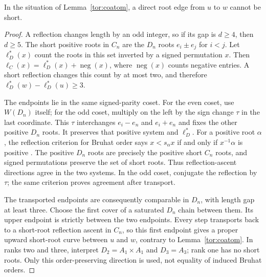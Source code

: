 \begin{lemma}\label{tor:short-edge}
In the situation of Lemma~\ref{tor:coatom}, a direct root edge from $u$ to $w$ cannot be short.
\end{lemma}
\begin{proof}
A reflection changes length by an odd integer, so if its gap is $d\ge4$, then $d\ge5$. The short positive roots in $C_n$ are the $D_n$ roots $e_i\pm e_j$ for $i<j$. Let $\ell_D^*(x)$ count the roots in this set inverted by a signed permutation $x$. Then $\ell_C(x)=\ell_D^*(x)+\operatorname{neg}(x)$, where $\operatorname{neg}(x)$ counts negative entries. A short reflection changes this count by at most two, and therefore $\ell_D^*(w)-\ell_D^*(u)\ge3$.

The endpoints lie in the same signed-parity coset. For the even coset, use $W(D_n)$ itself; for the odd coset, multiply on the left by the sign change $\tau$ in the last coordinate. This $\tau$ interchanges $e_i-e_n$ and $e_i+e_n$ and fixes the other positive $D_n$ roots. It preserves that positive system and $\ell_D^*$. For a positive root $\alpha$, the reflection criterion for Bruhat order says $x<s_\alpha x$ if and only if $x^{-1}\alpha$ is positive \cite[Chapter~2]{BB05}. The positive $D_n$ roots are precisely the positive short $C_n$ roots, and signed permutations preserve the set of short roots. Thus reflection-ascent directions agree in the two systems. In the odd coset, conjugate the reflection by $\tau$; the same criterion proves agreement after transport.

The transported endpoints are consequently comparable in $D_n$, with length gap at least three. Choose the first cover of a saturated $D_n$ chain between them. Its upper endpoint is strictly between the two endpoints. Every step transports back to a short-root reflection ascent in $C_n$, so this first endpoint gives a proper upward short-root curve between $u$ and $w$, contrary to Lemma~\ref{tor:coatom}. In ranks two and three, interpret $D_2=A_1\times A_1$ and $D_3=A_3$; rank one has no short roots. Only this order-preserving direction is used, not equality of induced Bruhat orders.
\end{proof}

